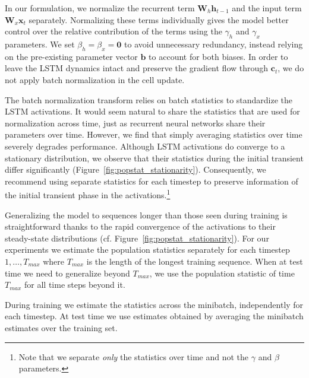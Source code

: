\documentclass{article} %
\newcommand{\vect}[1]{\mathbf{#1}}
\newcommand{\mat}[1]{\mathbf{#1}}
\begin{document}
In our formulation, we normalize the recurrent term $\mat{W}_h \vect{h}_{t-1}$ and the input term $\mat{W}_x \vect{x}_t$ separately.
Normalizing these terms individually gives the model better control over the relative contribution of the terms using the $\gamma_h$ and $\gamma_x$ parameters.
We set $\beta_h = \beta_x = \vect{0}$ to avoid unnecessary redundancy, instead relying on the pre-existing parameter vector $\vect{b}$ to account for both biases.
In order to leave the LSTM dynamics intact and preserve the gradient flow through $\vect{c}_t$, we do not apply batch normalization in the cell update.

The batch normalization transform relies on batch statistics to standardize the LSTM activations.
It would seem natural to share the statistics that are used for normalization across time,
just as recurrent neural networks share their parameters over time.
However, we find that simply averaging statistics over time severely degrades performance.
Although LSTM activations do converge to a stationary distribution, we observe that their statistics during the initial transient differ significantly (Figure~\ref{fig:popstat_stationarity}).
Consequently, we recommend using separate statistics for each timestep to preserve
information of the initial transient phase in the activations.\footnote{
Note that we separate \emph{only} the statistics over time and not the $\gamma$ and $\beta$ parameters.}

Generalizing the model to sequences longer than those seen during training
is straightforward thanks to the rapid convergence of the activations
to their steady-state distributions (cf. Figure~\ref{fig:popstat_stationarity}).
For our experiments we estimate the population statistics separately for each timestep $1, \ldots, T_{max}$ where $T_{max}$ is the length of the longest training sequence.
When at test time we need to generalize beyond $T_{max}$, we use the population statistic of time $T_{max}$ for all time steps beyond it.

During training we estimate the statistics across the minibatch, independently for each timestep.
At test time we use estimates obtained by averaging the minibatch estimates over the training set.


\end{document}
